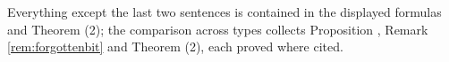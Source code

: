 Everything except the last two sentences is contained in the displayed formulas and Theorem (2); the comparison across types collects Proposition , Remark \ref{rem:forgottenbit} and Theorem (2), each proved where cited.
